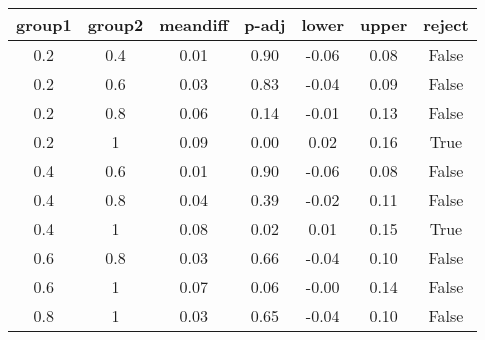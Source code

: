 \begin{tabular}{|c|c|c|c|c|c|c|}
\toprule
group1 & group2 &  meandiff &  p-adj &  lower &  upper &  reject \\
\midrule
   0.2 &    0.4 &      0.01 &   0.90 &  -0.06 &   0.08 &   False \\
   0.2 &    0.6 &      0.03 &   0.83 &  -0.04 &   0.09 &   False \\
   0.2 &    0.8 &      0.06 &   0.14 &  -0.01 &   0.13 &   False \\
   0.2 &      1 &      0.09 &   0.00 &   0.02 &   0.16 &    True \\
   0.4 &    0.6 &      0.01 &   0.90 &  -0.06 &   0.08 &   False \\
   0.4 &    0.8 &      0.04 &   0.39 &  -0.02 &   0.11 &   False \\
   0.4 &      1 &      0.08 &   0.02 &   0.01 &   0.15 &    True \\
   0.6 &    0.8 &      0.03 &   0.66 &  -0.04 &   0.10 &   False \\
   0.6 &      1 &      0.07 &   0.06 &  -0.00 &   0.14 &   False \\
   0.8 &      1 &      0.03 &   0.65 &  -0.04 &   0.10 &   False \\
\bottomrule
\end{tabular}
